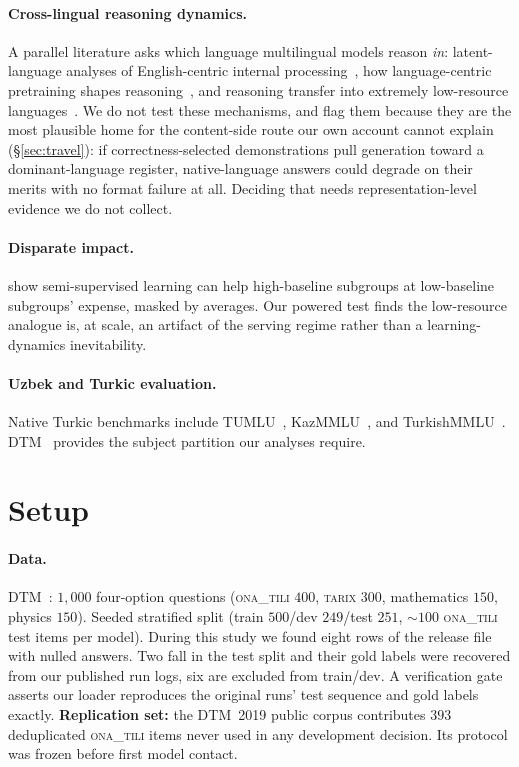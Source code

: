 \documentclass[11pt]{article}
\newcommand{\ona}{\textsc{ona\_tili}}
\newcommand{\tarix}{\textsc{tarix}}
\begin{document}
\paragraph{Cross-lingual reasoning dynamics.} A parallel literature asks which language
multilingual models reason \emph{in}: latent-language analyses of English-centric
internal processing~\citep{wendler2024llamas,schut2025english,zhong2024english}, how
language-centric pretraining shapes reasoning~\citep{park2025collapse}, and reasoning
transfer into extremely low-resource languages~\citep{tran2025pivoted}. We do not test
these mechanisms, and flag them because they are the most plausible home for the
content-side route our own account cannot explain (\S\ref{sec:travel}): if
correctness-selected demonstrations pull generation toward a dominant-language register,
native-language answers could degrade on their merits with no format failure at all.
Deciding that needs representation-level evidence we do not collect.
\paragraph{Disparate impact.} \citet{zhu2022rich} show semi-supervised learning can
help high-baseline subgroups at low-baseline subgroups' expense, masked by averages.
Our powered test finds the low-resource analogue is, at scale, an artifact of the
serving regime rather than a learning-dynamics inevitability.
\paragraph{Uzbek and Turkic evaluation.} Native Turkic benchmarks include
TUMLU~\citep{tumlu2025}, KazMMLU~\citep{kazmmlu2025}, and
TurkishMMLU~\citep{turkishmmlu2024}. DTM~\citep{dtm2026} provides the subject
partition our analyses require.

\section{Setup}\label{sec:setup}
\paragraph{Data.} DTM~\citep{dtm2026}: $1{,}000$ four-option questions (\ona{} $400$,
\tarix{} $300$, mathematics $150$, physics $150$). Seeded stratified split (train
$500$/dev $249$/test $251$, ${\sim}100$ \ona{} test items per model). During this
study we found eight rows of the release file with nulled answers. Two fall in the
test split and their gold labels were recovered from our published run logs, six are
excluded from train/dev. A verification gate asserts our loader reproduces the
original runs' test sequence and gold labels exactly. \textbf{Replication set:} the
DTM~2019 public corpus contributes $393$ deduplicated \ona{} items never used in any
development decision. Its protocol was frozen before first model contact.
\end{document}
